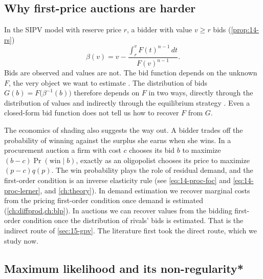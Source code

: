 \subsection{Why first-price auctions are harder}\label{sec:15-fpa-hard}

In the SIPV model with reserve price $r$, a bidder with value $v\ge r$ bids (\cref{prop:14-rs})
\[
\beta(v)=v-\frac{\int_r^vF(t)^{n-1}\,dt}{F(v)^{n-1}} .
\]
Bids are observed and values are not. The bid function depends on the unknown $F$, the very object we want to
estimate \citep[Section~3.1]{AtheyHaile2007}. The distribution of bids $G(b)=F\big(\beta^{-1}(b)\big)$ therefore depends
on $F$ in two ways, directly through the distribution of values and indirectly through the equilibrium strategy
\citep[p.~529]{GuerrePerrigneVuong2000}. Even a closed-form bid function does not tell us how to recover $F$ from $G$.

The economics of shading also suggests the way out. A bidder trades off the probability of winning against the
surplus she earns when she wins. In a procurement auction a firm with cost $c$ chooses its bid $b$ to maximize
$(b-c)\Pr(\text{win}\mid b)$, exactly as an oligopolist chooses its price to maximize $(p-c)q(p)$. The win probability
plays the role of residual demand, and the first-order condition is an inverse elasticity rule
(see \eqref{eq:14-proc-foc} and \eqref{eq:14-proc-lerner}, and \cref{ch:theory}). In demand estimation we recover marginal costs from the
pricing first-order condition once demand is estimated (\cref{ch:diffprod,ch:blp}). In auctions we can recover values
from the bidding first-order condition once the distribution of rivals' bids is estimated. That is the indirect route
of \cref{sec:15-gpv}. The literature first took the direct route, which we study now.

\subsection{Maximum likelihood and its non-regularity*}\label{sec:15-ml}


